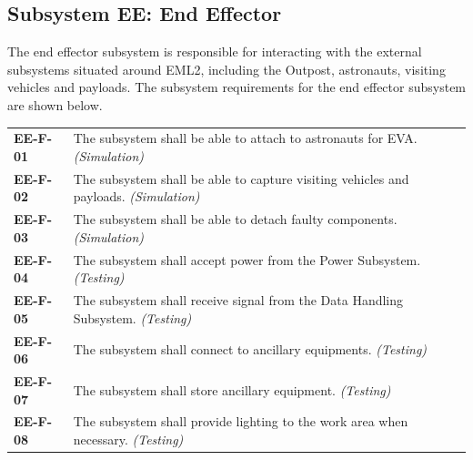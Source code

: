 \documentclass[12pt, letterpaper]{article}
\begin{document}
\subsection{Subsystem EE: End Effector}
The end effector subsystem is responsible for interacting with the external subsystems situated around EML2, including the Outpost, astronauts, visiting vehicles and payloads. The subsystem requirements for the end effector subsystem are shown below.

\vspace{-5pt}
\begin{longtable}{P{2cm}P{13.75cm}}
\textbf{EE-F-01}	& The subsystem shall be able to attach to astronauts for EVA. \textit{(Simulation)}							\\
\textbf{EE-F-02}	& The subsystem shall be able to capture visiting vehicles and payloads.	\textit{(Simulation)}						\\
\textbf{EE-F-03}	& The subsystem shall be able to detach faulty components. \textit{(Simulation)}									\\
\textbf{EE-F-04}	& The subsystem shall accept power from the Power Subsystem. \textit{(Testing)}										\\
\textbf{EE-F-05}	& The subsystem shall receive signal from the Data Handling Subsystem. \textit{(Testing)}								\\
\textbf{EE-F-06}	& The subsystem shall connect to ancillary equipments. \textit{(Testing)}										\\
\textbf{EE-F-07}	& The subsystem shall store ancillary equipment. \textit{(Testing)}													\\
\textbf{EE-F-08}	& The subsystem shall provide lighting to the work area when necessary. \textit{(Testing)}								\\
\end{longtable}
\vspace{-10pt}
\end{document}
